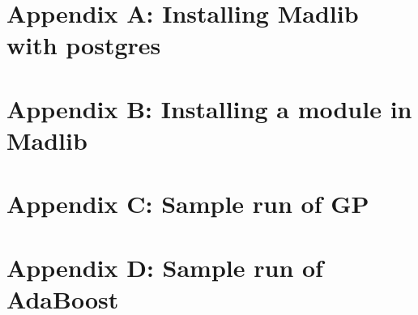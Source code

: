 
\section*{Appendix A: Installing Madlib with postgres}
\section*{Appendix B: Installing a module in Madlib}
\section*{Appendix C: Sample run of GP}
\section*{Appendix D: Sample run of AdaBoost}